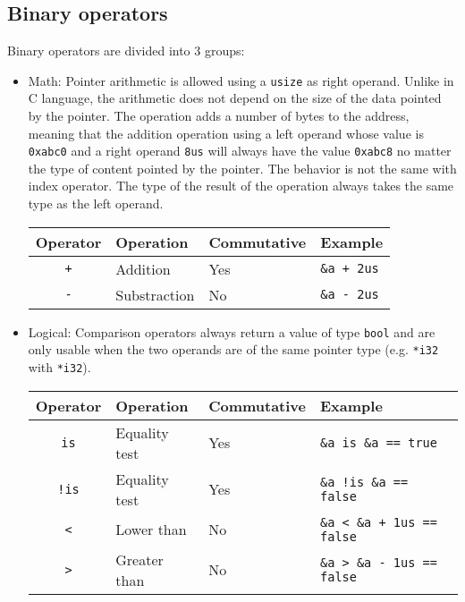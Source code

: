 \subsection {Binary operators}

Binary operators are divided into 3 groups:
\begin{itemize}
\item Math: Pointer arithmetic is allowed using a \texttt{usize} as right
  operand. Unlike in C language, the arithmetic does not depend on the size of
  the data pointed by the pointer. The operation adds a number of bytes to the
  address, meaning that the addition operation using a left operand whose value
  is \texttt{0xabc0} and a right operand \texttt{8us} will always have the value
  \texttt{0xabc8} no matter the type of content pointed by the pointer. The
  behavior is not the same with index operator. The type of the result of the
  operation always takes the same type as the left operand.

  \vspace{-20pt}%
  \begin{center}\begin{adjustbox}{max width=1\linewidth}
    \begin{tabular}{|c|lll|}
      \hline
      Operator & Operation & Commutative & Example \\
      \hline
      \hline
      \texttt{+} & Addition & Yes & \texttt{\&a + 2us} \\
      \texttt{-} & Substraction & No & \texttt{\&a - 2us} \\
      \hline
    \end{tabular}
  \end{adjustbox}\end{center}

\item Logical: Comparison operators always return a value of type \texttt{bool}
  and are only usable when the two operands are of the same pointer type (e.g.
  \texttt{*i32} with \texttt{*i32}).

  \vspace{-15pt}%
  \begin{center}\begin{adjustbox}{max width=1\linewidth}
    \begin{tabular}{|c|lll|}
      \hline
      Operator & Operation & Commutative & Example \\
      \hline
      \hline
      \texttt{is} & Equality test & Yes & \texttt{\&a is \&a == true}\\
      \texttt{!is} & Equality test & Yes & \texttt{\&a !is \&a == false}\\
      \texttt{<} & Lower than & No & \texttt{\&a < \&a + 1us == false}\\
      \texttt{>} & Greater than & No & \texttt{\&a > \&a - 1us == false}\\
      \hline
    \end{tabular}
  \end{adjustbox}\end{center}


\end{itemize}
